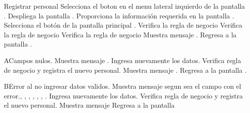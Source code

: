 	\begin{UCtrayectoria}{Registrar personal}
		\UCpaso[\UCactor] Selecciona el boton  en el menu lateral izquierdo de la pantalla .
		\UCpaso[\UCsist] Despliega la pantalla .
		\UCpaso[\UCactor] Proporciona la información requerida en la pantalla .
		\UCpaso[\UCactor] Selecciona el botón  de la pantalla principal .
		\UCpaso[\UCsist] Verifica la regla de negocio   
		\UCpaso[\UCsist] Verifica la regla de negocio  
		\UCpaso[\UCsist] Verifica la regla de negocio  
		\UCpaso[\UCsist] Muestra mensaje .
		\UCpaso[\UCsist] Regresa a la pantalla .
	\end{UCtrayectoria}
	\begin{UCtrayectoriaA}{A}{Campos nulos.}
		\UCpaso[\UCsist] Muestra mensaje .
			\UCpaso[\UCactor] Ingresa nuevamente los datos.
			\UCpaso[\UCsist] Verifica regla de negocio  y registra el nuevo personal. 
		\UCpaso[\UCsist] Muestra mensaje .
		\UCpaso[\UCsist] Regresa a la pantalla .
	\end{UCtrayectoriaA}
	
	\begin{UCtrayectoriaA}{B}{Error al no ingresar datos validos.}
		\UCpaso[\UCsist] Muestra mensaje segun sea el campo con el error., , , , , , .
			\UCpaso[\UCactor] Ingresa nuevamente los datos.
			\UCpaso[\UCsist] Verifica regla de negocio  y registra el nuevo personal. 
		\UCpaso[\UCsist] Muestra mensaje 
		\UCpaso[\UCsist] Regresa a la pantalla 
	\end{UCtrayectoriaA}

